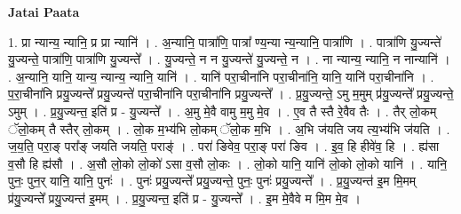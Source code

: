 \documentclass[17pt]{extarticle}
\begin{document}
\textbf{Jatai Paata} \newline

1. प्रा न्यान्य॒ न्यानि॒ प्र प्रा न्यानि॑ । . अ॒न्यानि॒ पात्रा॑णि॒ पात्रा᳚ ण्य॒न्या न्य॒न्यानि॒ पात्रा॑णि । . पात्रा॑णि यु॒ज्यन्ते॑ यु॒ज्यन्ते॒ पात्रा॑णि॒ पात्रा॑णि यु॒ज्यन्ते᳚ । . यु॒ज्यन्ते॒ न न यु॒ज्यन्ते॑ यु॒ज्यन्ते॒ न । . ना न्यान्य॒ न्यानि॒ न नान्यानि॑ । . अ॒न्यानि॒ यानि॒ यान्य॒ न्यान्य॒ न्यानि॒ यानि॑ । . यानि॑ परा॒चीना॑नि परा॒चीना॑नि॒ यानि॒ यानि॑ परा॒चीना॑नि । . प॒रा॒चीना॑नि प्रयु॒ज्यन्ते᳚ प्रयु॒ज्यन्ते॑ परा॒चीना॑नि परा॒चीना॑नि प्रयु॒ज्यन्ते᳚ । . प्र॒यु॒ज्यन्ते॒ ऽमु म॒मुम् प्र॑यु॒ज्यन्ते᳚ प्रयु॒ज्यन्ते॒ ऽमुम् । . प्र॒यु॒ज्यन्त॒ इति॑ प्र - यु॒ज्यन्ते᳚ । . अ॒मु मे॒वै वामु म॒मु मे॒व । . ए॒व तै स्तै रे॒वैव तैः । . तैर् लो॒कम् ॅलो॒कम् तै स्तैर् लो॒कम् । . लो॒क म॒भ्य॑भि लो॒कम् ॅलो॒क म॒भि । . अ॒भि ज॑यति जय त्य॒भ्य॑भि ज॑यति । . ज॒य॒ति॒ परा॒ङ् परा᳚ङ् जयति जयति॒ पराङ्॑ । . परा॑ ङिवेव॒ परा॒ङ् परा॑ ङिव । . इ॒व॒ हि हीवे॑व॒ हि । . ह्य॑सा व॒सौ हि ह्य॑सौ । . अ॒सौ लो॒को लो॒को॑ ऽसा व॒सौ लो॒कः । . लो॒को यानि॒ यानि॑ लो॒को लो॒को यानि॑ । . यानि॒ पुनः॒ पुन॒र् यानि॒ यानि॒ पुनः॑ । . पुनः॑ प्रयु॒ज्यन्ते᳚ प्रयु॒ज्यन्ते॒ पुनः॒ पुनः॑ प्रयु॒ज्यन्ते᳚ । . प्र॒यु॒ज्यन्त॑ इ॒म मि॒मम् प्र॑यु॒ज्यन्ते᳚ प्रयु॒ज्यन्त॑ इ॒मम् । . प्र॒यु॒ज्यन्त॒ इति॑ प्र - यु॒ज्यन्ते᳚ । . इ॒म मे॒वैवे म मि॒म मे॒व । \newline
\end{document}
